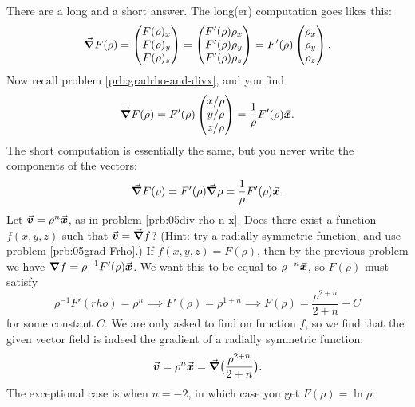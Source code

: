 \documentclass{amsart}
\begin{document}
\answer
There are a long and a short answer. 
The long(er) computation goes likes this:
\[
{\vec{\boldsymbol \nabla}} F(\rho)
= \begin{pmatrix} F(\rho)_x\\ F(\rho)_y \\ F(\rho)_z\end{pmatrix}
= \begin{pmatrix} F'(\rho)\rho_x\\ F'(\rho)\rho_y \\ F'(\rho)\rho_z\end{pmatrix}
= F'(\rho)\begin{pmatrix} \rho_x\\\rho_y\\\rho_z\end{pmatrix}.
\]
Now recall problem \ref{prb:gradrho-and-divx}, and you find
\[
{\vec{\boldsymbol \nabla}} F(\rho)
=F'(\rho)\begin{pmatrix} x/\rho\\y/\rho\\z/\rho\end{pmatrix}
=\frac{1} {\rho}F'(\rho) {{\vec{\boldsymbol x}}}.
\]
The short computation is essentially the same, but you never
write the components of the vectors:
\[
{\vec{\boldsymbol \nabla}} F(\rho) = F'(\rho) {\vec{\boldsymbol \nabla}} \rho = \frac{1} {\rho}F'(\rho){{\vec{\boldsymbol x}}}.
\]
\endanswer
\subprob Let ${{\vec{\boldsymbol v}}} = \rho^n{{\vec{\boldsymbol x}}}$, as in problem \ref{prb:05div-rho-n-x}. %
Does there exist a function $f(x, y, z)$ such that ${{\vec{\boldsymbol v}}} = {\vec{\boldsymbol \nabla}} f$?
(Hint: try a radially symmetric function, and use problem
\ref{prb:05grad-Frho}.)
\answer
If $f(x, y, z)= F(\rho)$, then by the previous problem
we have ${\vec{\boldsymbol \nabla}} f = \rho^{-1}F'(\rho) {{\vec{\boldsymbol x}}}$.  We want this to be equal to
$\rho^{-n}{{\vec{\boldsymbol x}}}$, so $F(\rho)$ must satisfy
\[
\rho^{-1}F'(rho) = \rho^{n} \implies
F'(\rho) = \rho^{1+n} \implies
F(\rho) = \frac{\rho^{2+n}} {2+n} +C
\]
for some constant $C$.  We are only asked to find on function $f$,
so we find that the given vector field is indeed the gradient of a radially
symmetric function:
\[
{{\vec{\boldsymbol v}}} = \rho^{n}{{\vec{\boldsymbol x}}} = {\vec{\boldsymbol \nabla}} \bigl(\frac{\rho^{2+n}} {2+n}\bigr).
\]
The exceptional case is when $n=-2$, in which case you get
$F(\rho) = \ln \rho$.
\endanswer

\immediate\closeout\ans

\begin{trivlist}
  
\end{trivlist}
\end{document}
